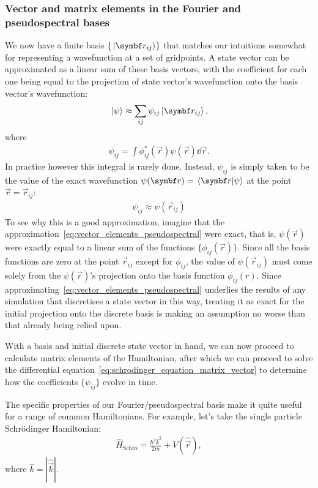 \subsubsection{Vector and matrix elements in the Fourier and pseudospectral bases}\label{sec:fourier_pseudospectral}

We now have a finite basis $\{\ket{\vec r_{ij}}\}$ that matches our intuitions somewhat for representing a wavefunction at a set of gridpoints. A state vector can be approximated as a linear sum of these basis vectors, with the coefficient for each one being equal to the projection of state vector's wavefunction onto the basis vector's wavefunction:
\begin{align}\label{eq:vector_elements_pseudospectral}
\ket{\psi} \approx \sum_{ij} \psi_{ij} \ket{\vec r_{i j}},
\end{align}
where
\begin{align}
\psi_{i j} = \int \phi_{ij}^*(\vec r) \psi(\vec r) \dd{\vec r}.
\end{align}
In practice however this integral is rarely done. Instead, $\psi_{ij}$ is simply taken to be the value of the exact wavefunction $\psi(\vec r) = \braket{\vec r}{\psi}$ at the point $\vec r = \vec r_{ij}$:
\begin{align}\label{eq:pseudospectral_vector}
\psi_{i j} \approx \psi(\vec r_{ij})
\end{align}
 To see why this is a good approximation, imagine that the approximation~\eqref{eq:vector_elements_pseudospectral} were exact, that is, $\psi(\vec r)$ were exactly equal to a linear sum of the functions $\{\phi_{ij}(\vec r)\}$. Since all the basis functions are zero at the point $\vec r_{ij}$ except for $\phi_{ij}$, the value of $\psi(\vec r_{ij})$ must come solely from the $\psi(\vec r)$'s projection onto the basis function $\phi_{ij}(r)$. Since approximating~\eqref{eq:vector_elements_pseudospectral} underlies the results of any simulation that discretises a state vector in this way, treating it as exact for the initial projection onto the discrete basis is making an assumption no worse than that already being relied upon.


With a basis and initial discrete state vector in hand, we can now proceed to calculate matrix elements of the Hamiltonian, after which we can proceed to solve the differential equation~\eqref{eq:schrodinger_equation_matrix_vector} to determine how the coefficients $\{\psi_{ij}\}$ evolve in time.

The specific properties of our Fourier/pseudospectral basis make it quite useful for a range of common Hamiltonians. For example, let's take the single particle Schr\"odinger Hamiltonian:
\begin{align}
\hat H_\textrm{Schr\"o} = \frac{\hbar^2 \hat k ^2}{2m}  + V(\hat {\vec r}),
\end{align}
where $\hat k = |\hat{\vec k}|$.

